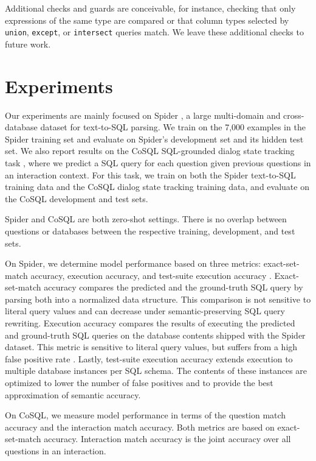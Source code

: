\documentclass[11pt]{article}
\newcommand{\texttosql}{text-to-SQL}
\begin{document}
Additional checks and guards are conceivable,
for instance, checking that only expressions of the same type are compared
or that column types selected by \verb+union+, \verb+except+, or \verb+intersect+
queries match.
We leave these additional checks to future work.

\section{Experiments}

Our experiments are mainly
focused on Spider \citep{Yu_2018},
a large multi-domain and cross-database dataset for \texttosql{} parsing.
We train on the 7,000 examples in the Spider training set
and evaluate on Spider's development set and its hidden test set.
We also report results on the
CoSQL SQL-grounded dialog state tracking task \citep{yu-etal-2019-cosql},
where we predict a SQL query for each question given previous questions
in an interaction context.
For this task, we train on both the Spider \texttosql{} training data
and the CoSQL dialog state tracking training data,
and evaluate on the CoSQL development and test sets.

Spider and CoSQL are both zero-shot settings.
There is no overlap between questions or databases
between the respective training, development, and test sets.

On Spider, we determine model performance based on three metrics:
exact-set-match accuracy, execution accuracy,
and test-suite execution accuracy \citep{Zhong_2020}.
Exact-set-match accuracy
compares the predicted and the ground-truth SQL query
by parsing both into a normalized data structure.
This comparison is not sensitive to literal query values
and can decrease under semantic-preserving SQL query rewriting.
Execution accuracy compares the results of
executing the predicted and ground-truth SQL queries on
the database contents shipped with the Spider dataset.
This metric is sensitive to literal query values,
but suffers from a high false positive rate \citep{Zhong_2020}.
Lastly, test-suite execution accuracy 
extends execution to multiple database instances per SQL schema.
The contents of these instances
are optimized to lower the number of false positives
and to provide the best approximation of semantic accuracy.

On CoSQL, we measure model performance in terms of
the question match accuracy and the interaction match accuracy.
Both metrics are based on exact-set-match accuracy.
Interaction match accuracy is the joint accuracy over all questions in an interaction.
\end{document}
